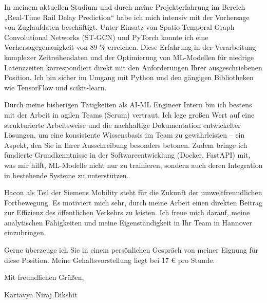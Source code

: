 \documentclass[10pt, a4paper]{article}
\begin{document}
In meinem aktuellen Studium und durch meine Projekterfahrung im Bereich „Real-Time Rail Delay Prediction“ habe ich mich intensiv mit der Vorhersage von Zuglaufdaten beschäftigt. Unter Einsatz von Spatio-Temporal Graph Convolutional Networks (ST-GCN) und PyTorch konnte ich eine Vorhersagegenauigkeit von 89 \% erreichen. Diese Erfahrung in der Verarbeitung komplexer Zeitreihendaten und der Optimierung von ML-Modellen für niedrige Latenzzeiten korrespondiert direkt mit den Anforderungen Ihrer ausgeschriebenen Position. Ich bin sicher im Umgang mit Python und den gängigen Bibliotheken wie TensorFlow und scikit-learn.

Durch meine bisherigen Tätigkeiten als AI-ML Engineer Intern bin ich bestens mit der Arbeit in agilen Teams (Scrum) vertraut. Ich lege großen Wert auf eine strukturierte Arbeitsweise und die nachhaltige Dokumentation entwickelter Lösungen, um eine konsistente Wissensbasis im Team zu gewährleisten – ein Aspekt, den Sie in Ihrer Ausschreibung besonders betonen. Zudem bringe ich fundierte Grundkenntnisse in der Softwareentwicklung (Docker, FastAPI) mit, was mir hilft, ML-Modelle nicht nur zu trainieren, sondern auch deren Integration in bestehende Systeme zu unterstützen.

Hacon als Teil der Siemens Mobility steht für die Zukunft der umweltfreundlichen Fortbewegung. Es motiviert mich sehr, durch meine Arbeit einen direkten Beitrag zur Effizienz des öffentlichen Verkehrs zu leisten. Ich freue mich darauf, meine analytischen Fähigkeiten und meine Eigenständigkeit in Ihr Team in Hannover einzubringen.

Gerne überzeuge ich Sie in einem persönlichen Gespräch von meiner Eignung für diese Position. Meine Gehaltsvorstellung liegt bei 17 € pro Stunde.

\vspace{25pt}

Mit freundlichen Grüßen,

\vspace{15pt}

Kartavya Niraj Dikshit
\end{document}
